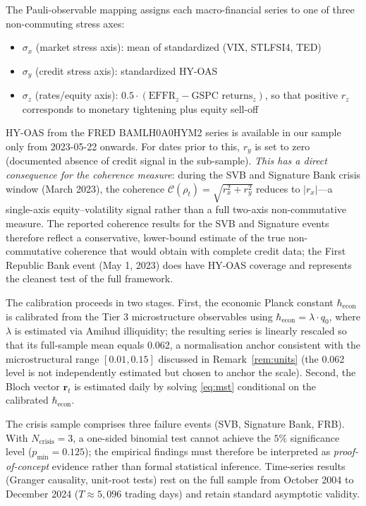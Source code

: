 The Pauli-observable mapping assigns each macro-financial series to one of three
non-commuting stress axes:
\begin{itemize}
    \item $\sigma_x$ (market stress axis): mean of standardized (VIX, STLFSI4, TED)
    \item $\sigma_y$ (credit stress axis): standardized HY-OAS
    \item $\sigma_z$ (rates/equity axis): $0.5 \cdot (\text{EFFR}_z
        - \text{GSPC returns}_z)$, so that positive $r_z$ corresponds to monetary
        tightening plus equity sell-off
\end{itemize}
HY-OAS from the FRED BAMLH0A0HYM2 series is available in our sample only from
2023-05-22 onwards. For dates prior to this, $r_y$ is set to zero (documented
absence of credit signal in the sub-sample). \emph{This has a direct consequence
for the coherence measure}: during the SVB and Signature Bank crisis window
(March 2023), the coherence $\mathcal{C}(\rho_t) = \sqrt{r_x^2 + r_y^2}$
reduces to $|r_x|$---a single-axis equity--volatility signal rather than a
full two-axis non-commutative measure. The reported coherence results for the
SVB and Signature events therefore reflect a conservative, lower-bound estimate
of the true non-commutative coherence that would obtain with complete credit
data; the First Republic Bank event (May 1, 2023) does have HY-OAS coverage and
represents the cleanest test of the full framework.

The calibration proceeds in two stages. First, the economic Planck constant
$\hbar_{\mathrm{econ}}$ is calibrated from the Tier 3 microstructure observables
using $\hbar_{\mathrm{econ}} = \lambda \cdot q_0$, where $\lambda$ is estimated
via Amihud illiquidity; the resulting series is linearly rescaled so that its
full-sample mean equals 0.062, a normalisation anchor consistent with the
microstructural range $[0.01, 0.15]$ discussed in Remark~\ref{rem:units}
(the 0.062 level is not independently estimated but chosen to anchor the scale).
Second, the Bloch vector $\mathbf{r}_t$ is estimated
daily by solving \eqref{eq:mst} conditional on the calibrated
$\hbar_{\mathrm{econ}}$.

\begin{remark}\label{rem:stat-power}
The crisis sample comprises three failure events (SVB, Signature Bank, FRB).
With $N_{\mathrm{crisis}} = 3$, a one-sided binomial test cannot achieve the
$5\%$ significance level ($p_{\min} = 0.125$); the empirical findings must
therefore be interpreted as \emph{proof-of-concept} evidence rather than
formal statistical inference. Time-series results (Granger causality, unit-root
tests) rest on the full sample from October 2004 to December 2024 ($T \approx 5{,}096$ trading days)
and retain standard asymptotic validity.
\end{remark}

